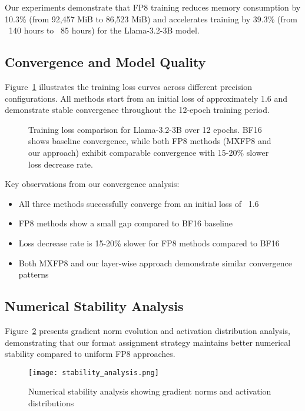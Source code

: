 \documentclass[conference]{IEEEtran}
\begin{document}
Our experiments demonstrate that FP8 training reduces memory consumption by 10.3\% (from 92,457 MiB to 86,523 MiB) and accelerates training by 39.3\% (from ~140 hours to ~85 hours) for the Llama-3.2-3B model.

\subsection{Convergence and Model Quality}

Figure~\ref{fig:convergence_analysis} illustrates the training loss curves across different precision configurations. All methods start from an initial loss of approximately 1.6 and demonstrate stable convergence throughout the 12-epoch training period.

\begin{figure}[htbp]
    \centering
    \caption{Training loss comparison for Llama-3.2-3B over 12 epochs. BF16 shows baseline convergence, while both FP8 methods (MXFP8 and our approach) exhibit comparable convergence with 15-20\% slower loss decrease rate.}
    \label{fig:convergence_analysis}
\end{figure}

Key observations from our convergence analysis:
\begin{itemize}
\item All three methods successfully converge from an initial loss of ~1.6
\item FP8 methods show a small gap compared to BF16 baseline
\item Loss decrease rate is 15-20\% slower for FP8 methods compared to BF16
\item Both MXFP8 and our layer-wise approach demonstrate similar convergence patterns
\end{itemize}

\subsection{Numerical Stability Analysis}

Figure~\ref{fig:stability_analysis} presents gradient norm evolution and activation distribution analysis, demonstrating that our format assignment strategy maintains better numerical stability compared to uniform FP8 approaches.

\begin{figure}[htbp]
    \centering
    \texttt{[image: stability\_analysis.png]}
    \caption{Numerical stability analysis showing gradient norms and activation distributions}
    \label{fig:stability_analysis}
\end{figure}
\end{document}
